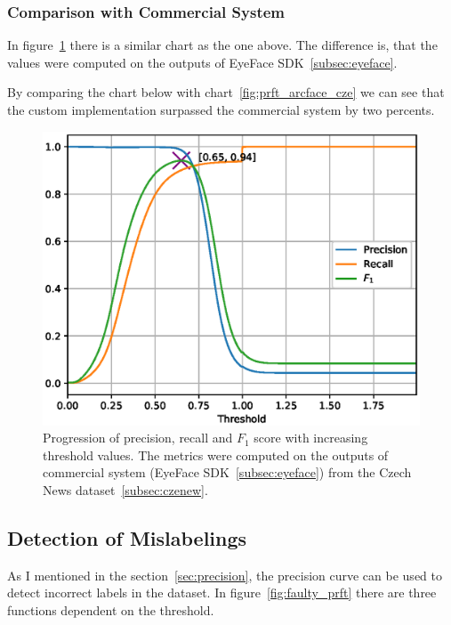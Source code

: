 \subsubsection{Comparison with Commercial System}\label{subsubsec:performance-comparison}
In figure~\ref{fig:prft_eyedea} there is a similar chart as the one above.
The difference is, that the values were computed on the outputs of EyeFace SDK~\ref{subsec:eyeface}.

By comparing the chart below with chart~\ref{fig:prft_arcface_cze} we can see that the custom implementation
surpassed the commercial system by two percents.

\begin{figure}[H]
    \centering
    \includegraphics[width=0.95\columnwidth]{images/implementation/prft_eyedea.eps}
    \caption{Progression of precision, recall and $F_1$ score with increasing threshold values. The metrics were
    computed on the outputs of commercial system (EyeFace SDK~\ref{subsec:eyeface}) from the Czech News
    dataset~\ref{subsec:czenew}.}
    \label{fig:prft_eyedea}
\end{figure}
\newpage
\subsection{Detection of Mislabelings}\label{subsec:detection-mislabelings}
As I mentioned in the section~\ref{sec:precision}, the precision curve can be used to detect incorrect labels in the
dataset.
In figure~\ref{fig:faulty_prft} there are three functions dependent on the threshold.

